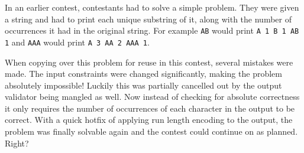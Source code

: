 

In an earlier contest, contestants had to solve a simple
problem. They were given a string and had to print each
unique substring of it, along with the number of occurrences
it had in the original string. For example \texttt{AB}
would print \texttt{A 1 B 1 AB 1} and \texttt{AAA} would
print \texttt{A 3 AA 2 AAA 1}.

When copying over this problem for reuse in this contest,
several mistakes were made. The input constraints were changed
significantly, making the problem absolutely impossible!
Luckily this was partially cancelled out by the output
validator being mangled as well. Now instead of checking
for absolute correctness it only requires the number of
occurrences of each character in the output to be correct.
With a quick hotfix of applying run length encoding to the
output, the problem was finally solvable again and the
contest could continue on as planned. Right?

